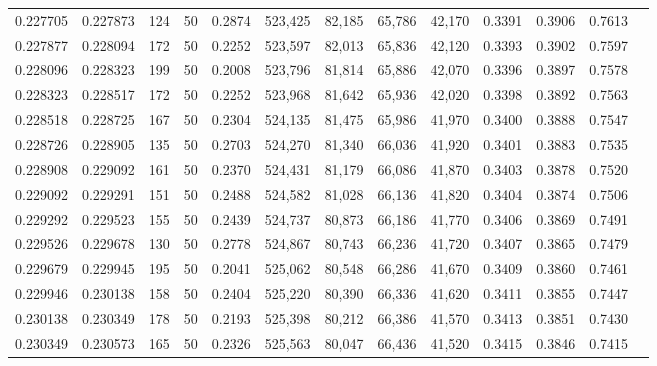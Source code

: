 \begin{tabular}{rrrrrrrrrrrrr}
0.227705 & 0.227873 &   124 &  50 &                                     0.2874 & 523,425 &  82,185 &  65,786 &  42,170 & 0.3391 & 0.3906 & 0.7613 \\
0.227877 & 0.228094 &   172 &  50 &                                     0.2252 & 523,597 &  82,013 &  65,836 &  42,120 & 0.3393 & 0.3902 & 0.7597 \\
0.228096 & 0.228323 &   199 &  50 &                                     0.2008 & 523,796 &  81,814 &  65,886 &  42,070 & 0.3396 & 0.3897 & 0.7578 \\
0.228323 & 0.228517 &   172 &  50 &                                     0.2252 & 523,968 &  81,642 &  65,936 &  42,020 & 0.3398 & 0.3892 & 0.7563 \\
0.228518 & 0.228725 &   167 &  50 &                                     0.2304 & 524,135 &  81,475 &  65,986 &  41,970 & 0.3400 & 0.3888 & 0.7547 \\
0.228726 & 0.228905 &   135 &  50 &                                     0.2703 & 524,270 &  81,340 &  66,036 &  41,920 & 0.3401 & 0.3883 & 0.7535 \\
0.228908 & 0.229092 &   161 &  50 &                                     0.2370 & 524,431 &  81,179 &  66,086 &  41,870 & 0.3403 & 0.3878 & 0.7520 \\
0.229092 & 0.229291 &   151 &  50 &                                     0.2488 & 524,582 &  81,028 &  66,136 &  41,820 & 0.3404 & 0.3874 & 0.7506 \\
0.229292 & 0.229523 &   155 &  50 &                                     0.2439 & 524,737 &  80,873 &  66,186 &  41,770 & 0.3406 & 0.3869 & 0.7491 \\
0.229526 & 0.229678 &   130 &  50 &                                     0.2778 & 524,867 &  80,743 &  66,236 &  41,720 & 0.3407 & 0.3865 & 0.7479 \\
0.229679 & 0.229945 &   195 &  50 &                                     0.2041 & 525,062 &  80,548 &  66,286 &  41,670 & 0.3409 & 0.3860 & 0.7461 \\
0.229946 & 0.230138 &   158 &  50 &                                     0.2404 & 525,220 &  80,390 &  66,336 &  41,620 & 0.3411 & 0.3855 & 0.7447 \\
0.230138 & 0.230349 &   178 &  50 &                                     0.2193 & 525,398 &  80,212 &  66,386 &  41,570 & 0.3413 & 0.3851 & 0.7430 \\
0.230349 & 0.230573 &   165 &  50 &                                     0.2326 & 525,563 &  80,047 &  66,436 &  41,520 & 0.3415 & 0.3846 & 0.7415 \\

\end{tabular}
